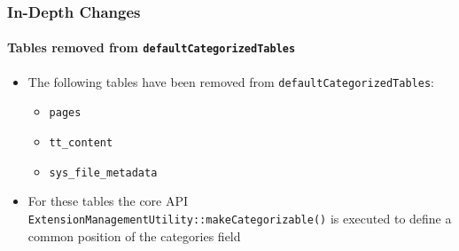 \begin{frame}[fragile]
	\frametitle{In-Depth Changes}
	\framesubtitle{Tables removed from \texttt{defaultCategorizedTables}}

	\begin{itemize}
		\item The following tables have been removed from \texttt{defaultCategorizedTables}:

			\begin{itemize}
				\item \texttt{pages}
				\item \texttt{tt\_content}
				\item \texttt{sys\_file\_metadata}
			\end{itemize}

		\item For these tables the core API\newline
			\texttt{ExtensionManagementUtility::makeCategorizable()}\newline
			is executed to define a common position of the categories field

	\end{itemize}

\end{frame}


